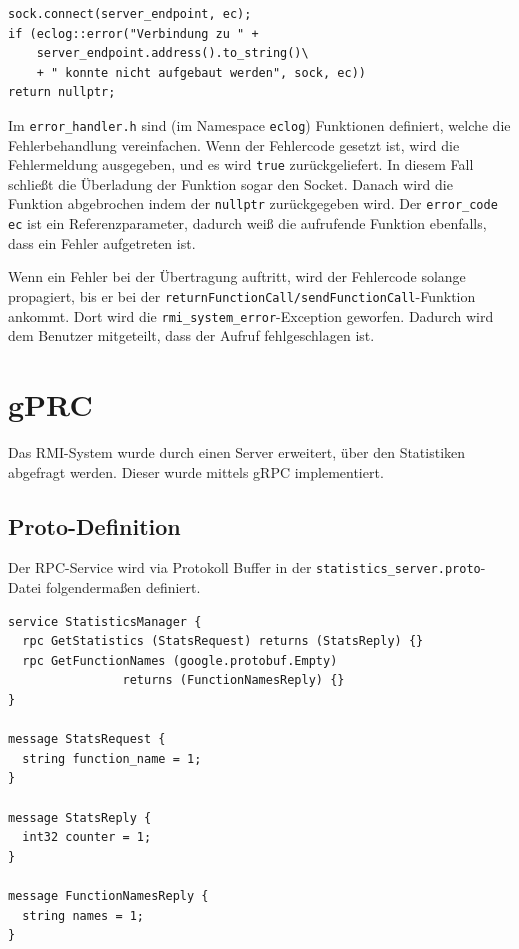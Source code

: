 \documentclass[a4paper,oneside,10pt]{report}
\begin{document}
\begin{lstlisting}
sock.connect(server_endpoint, ec);
if (eclog::error("Verbindung zu " + 
	server_endpoint.address().to_string()\
	+ " konnte nicht aufgebaut werden", sock, ec)) 
return nullptr;
\end{lstlisting}

Im \texttt{error\_handler.h} sind (im Namespace \texttt{eclog}) Funktionen definiert, welche die Fehlerbehandlung vereinfachen. Wenn der Fehlercode gesetzt ist, wird die Fehlermeldung ausgegeben, und es wird \texttt{true} zurückgeliefert. In diesem Fall schließt die Überladung der Funktion sogar den Socket. Danach wird die Funktion abgebrochen indem der \texttt{nullptr} zurückgegeben wird. Der \texttt{error\_code ec} ist ein Referenzparameter, dadurch weiß die aufrufende Funktion ebenfalls, dass ein Fehler aufgetreten ist. 

Wenn ein Fehler bei der Übertragung auftritt, wird der Fehlercode solange propagiert, bis er bei der \texttt{returnFunctionCall/sendFunctionCall}-Funktion ankommt. Dort wird die \texttt{rmi\_system\_error}-Exception geworfen. Dadurch wird dem Benutzer mitgeteilt, dass der Aufruf fehlgeschlagen ist. 

\section{gPRC}

Das RMI-System wurde durch einen Server erweitert, über den Statistiken abgefragt werden. Dieser wurde mittels gRPC implementiert.

\subsection{Proto-Definition}

Der RPC-Service wird via Protokoll Buffer in der \texttt{statistics\_server.proto}-Datei folgendermaßen definiert.

\begin{lstlisting}
service StatisticsManager {
  rpc GetStatistics (StatsRequest) returns (StatsReply) {}
  rpc GetFunctionNames (google.protobuf.Empty) 
				returns (FunctionNamesReply) {}
}

message StatsRequest {
  string function_name = 1;
}

message StatsReply {
  int32 counter = 1;
}

message FunctionNamesReply {
  string names = 1;
}
\end{lstlisting}
\end{document}
